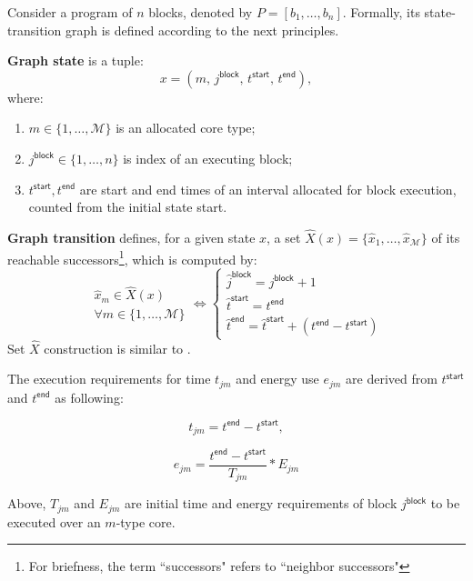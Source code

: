 Consider a program of $n$ blocks, denoted by $P = [b_1,\ldots,b_n]$.
Formally, its state-transition graph is defined according to the next principles.

\textbf{Graph state} is a tuple:
%
\begin{equation}
x = \left(m, \, j^\mathsf{block}, \, t^\mathsf{start}, \, t^\mathsf{end} \right),
\label{eq:graphState}
\end{equation}
%
where:
%
\begin{enumerate}
\item $m \in \{1,\ldots,\mathcal{M}\}$ is an allocated core type;
\item $j^\mathsf{block} \in \{1,\ldots,n\}$ is index of an executing block;
\item $t^\mathsf{start}, t^\mathsf{end}$ are start and end times of an interval allocated for block execution, counted from the initial state start.
\end{enumerate}


\textbf{Graph transition} defines, for a given state $x$, a set $\hat{X}(x)=\{\hat{x}_1, \ldots, \hat{x}_\mathcal{M}\}$ of its reachable successors\footnote{For briefness, the term ``successors" refers to ``neighbor successors"}, which is computed by:
%
\begin{equation}
\begin{aligned}
\hat{x}_m \in \hat{X}(x) \\
\forall m \in \{1,\ldots,\mathcal{M}\}
\end{aligned}
\iff
%
\begin{cases}
\hat{j}^\mathsf{block} = j^\mathsf{block} +1\\
\hat{t}^\mathsf{start} = t^\mathsf{end}\\
\hat{t}^\mathsf{end} = \hat{t}^\mathsf{start} + \left(t^\mathsf{end} - t^\mathsf{start}\right)
\end{cases}
\end{equation}
%
Set $\hat{X}$ construction is similar to \cite{Burmyakov2015}.

The execution requirements for time $t_{jm}$ and energy use $e_{jm}$ are derived from $t^\mathsf{start}$ and $t^\mathsf{end}$ as following:
%

\begin{minipage}{0.35\columnwidth}
\smallskip
\begin{equation}
t_{jm} = t^\mathsf{end} - t^\mathsf{start},
\end{equation}
\smallskip
\end{minipage}%
\begin{minipage}{.35\columnwidth}
\smallskip
\begin{equation}
e _{jm}= \frac{t^\mathsf{end} - t^\mathsf{start}}{T_{jm}}*E_{jm}
\end{equation}
\smallskip
\end{minipage}
%
Above, $T_{jm}$ and $E_{jm}$ are initial time and energy requirements of block $j^\mathsf{block}$ to be executed over an $m$-type core.  


